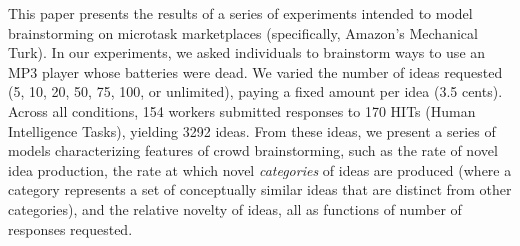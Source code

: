 


This paper presents the results of a series of experiments intended to model brainstorming on microtask marketplaces (specifically, Amazon's Mechanical Turk). In our experiments, we asked individuals to brainstorm ways to use an MP3 player whose batteries were dead. We varied the number of ideas requested (5, 10, 20, 50, 75, 100, or unlimited), paying a fixed amount per idea (3.5 cents). Across all conditions, 154 workers submitted responses to 170 HITs (Human Intelligence Tasks), yielding 3292 ideas. From these ideas, we present a series of models characterizing features of crowd brainstorming, such as the rate of novel idea production, the rate at which novel {\em categories\/} of ideas are produced (where a category represents a set of conceptually similar ideas that are distinct from other categories), and the relative novelty of ideas, all as functions of number of responses requested.

